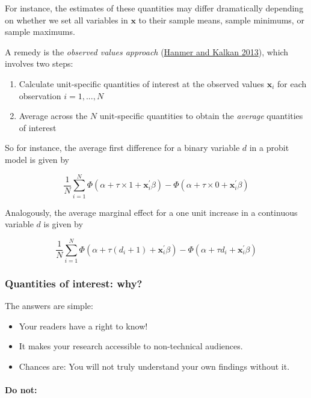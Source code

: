 \documentclass[
  11pt,
]{article}
\providecommand{\tightlist}{%
  \setlength{\itemsep}{0pt}\setlength{\parskip}{0pt}}
\begin{document}
For instance, the estimates of these quantities may differ dramatically depending on whether we set all variables in \(\mathbf{x}\) to their sample means, sample minimums, or sample maximums.

A remedy is the \emph{observed values approach} (\href{https://onlinelibrary.wiley.com/doi/full/10.1111/j.1540-5907.2012.00602.x}{Hanmer and Kalkan 2013}), which involves two steps:

\begin{enumerate}
\def\labelenumi{\arabic{enumi}.}
\tightlist
\item
  Calculate unit-specific quantities of interest at the observed values \(\mathbf{x}_i\) for each observation \(i = 1,...,N\)
\item
  Average across the \(N\) unit-specific quantities to obtain the \emph{average} quantities of interest
\end{enumerate}

So for instance, the average first difference for a binary variable \(d\) in a probit model is given by

\[\frac{1}{N} \sum_{i=1}^{N}\Phi(\alpha + \tau \times 1 + \mathbf{x}_i^{\prime} \beta) - \Phi(\alpha + \tau \times 0 + \mathbf{x}_i^{\prime} \beta)\]

Analogously, the average marginal effect for a one unit increase in a continuous variable \(d\) is given by

\[\frac{1}{N} \sum_{i=1}^{N}\Phi(\alpha + \tau (d_i + 1) + \mathbf{x}_i^{\prime} \beta) - \Phi(\alpha + \tau d_i + \mathbf{x}_i^{\prime} \beta)\]

\hypertarget{quantities-of-interest-why}{%
\subsubsection{Quantities of interest: why?}\label{quantities-of-interest-why}}

The answers are simple:

\begin{itemize}
\tightlist
\item
  Your readers have a right to know!
\item
  It makes your research accessible to non-technical audiences.
\item
  Chances are: You will not truly understand your own findings without it.
\end{itemize}

\hypertarget{do-not}{%
\paragraph{Do not:}\label{do-not}}
\end{document}
